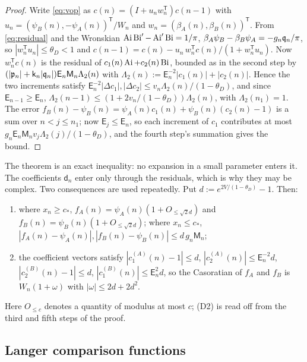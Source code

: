 \begin{proof}
 Write \eqref{eq:vop} as $c(n)=(I+u_nw_n^{\mathsf T})c(n-1)$ with
$u_n=(\psi_B(n),-\psi_A(n))^{\mathsf T}/W_n$ and $w_n=(\beta_A(n),\beta_B(n))^{\mathsf T}$. From
\eqref{eq:residual} and the Wronskian $\operatorname{Ai}\operatorname{Bi}'-\operatorname{Ai}'\operatorname{Bi}=1/\pi$,
$\beta_A\psi_B-\beta_B\psi_A=-g_n\mathfrak{q}_n/\pi$, so $|w_n^{\mathsf T}u_n|\le\theta_D<1$ and
$c(n-1)=c(n)-u_n\,w_n^{\mathsf T}c(n)/(1+w_n^{\mathsf T}u_n)$. Now $w_n^{\mathsf T}c(n)$ is the
residual of $c_1(n)\operatorname{Ai}+c_2(n)\operatorname{Bi}$, bounded as in the second step by
$(|\mathfrak{p}_n|+\mathsf k_n|\mathfrak{q}_n|)\mathsf E_n\mathsf M_n\Lambda_2(n)$ with
$\Lambda_2(n):=\mathsf E_n^{-2}|c_1(n)|+|c_2(n)|$. Hence the two increments satisfy
$\mathsf E_n^{-2}|\Delta c_1|,|\Delta c_2|\le v_n\Lambda_2(n)/(1-\theta_D)$, and since
$\mathsf E_{n-1}\ge\mathsf E_n$, $\Lambda_2(n-1)\le(1+2v_n/(1-\theta_D))\Lambda_2(n)$, with
$\Lambda_2(n_1)=1$. The error $f_B(n)-\psi_B(n)=\psi_A(n)c_1(n)+\psi_B(n)(c_2(n)-1)$ is a sum
over $n<j\le n_1$; now $\mathsf E_j\le\mathsf E_n$, so each increment of $c_1$ contributes at most
$g_n\mathsf E_n\mathsf M_nv_j\Lambda_2(j)/(1-\theta_D)$, and the fourth step's summation gives the
bound.
\end{proof}

The theorem is an exact inequality: no expansion in a small parameter enters it. The
coefficients $\mathsf d_n$ enter only through the residuals, which is why they may be complex. Two consequences are used
repeatedly. Put $d:=e^{2V/(1-\theta_D)}-1$. Then:
\begin{enumerate}
\item[(D1)] where $x_n\ge c_*$, $f_A(n)=\psi_A(n)(1+O_{\le\sqrt2d})$ and
  $f_B(n)=\psi_B(n)(1+O_{\le\sqrt2d})$; where $x_n\le c_*$,
  $|f_A(n)-\psi_A(n)|,|f_B(n)-\psi_B(n)|\le d\,g_n\mathsf M_n$;
\item[(D2)] the coefficient vectors satisfy $|c^{(A)}_1(n)-1|\le d$,
  $|c^{(A)}_2(n)|\le\mathsf E_n^{-2}d$, $|c^{(B)}_2(n)-1|\le d$, $|c^{(B)}_1(n)|\le\mathsf E_n^2d$, so the
  Casoratian of $f_A$ and $f_B$ is $W_n(1+\omega)$ with $|\omega|\le2d+2d^2$.
\end{enumerate}
Here $O_{\le c}$ denotes a quantity of modulus at most $c$; (D2) is read off from the
third and fifth steps of the proof.

\subsection{Langer comparison functions}

